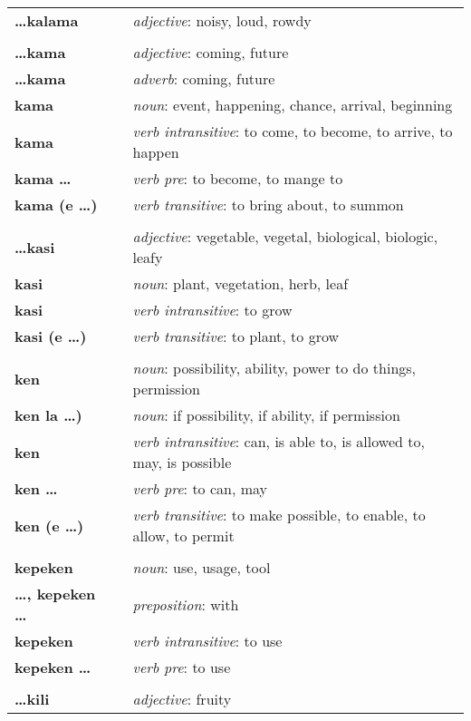 \begin{supertabular}{p{2,5cm}|ll}
\textbf{\dots kalama} && \textit{adjective}: noisy, loud, rowdy \\ 
 && \\ %
\textbf{\dots kama} && \textit{adjective}: coming, future \\ 
\textbf{\dots kama} && \textit{adverb}: coming, future \\ 
\textbf{kama} && \textit{noun}: event, happening, chance, arrival, beginning \\ 
\textbf{kama} && \textit{verb intransitive}: to come, to become, to arrive, to happen \\ 
\textbf{kama \dots} && \textit{verb pre}: to become, to mange to \\ 
\textbf{kama (e \dots)} && \textit{verb transitive}: to bring about, to summon \\ 
 && \\ %
\textbf{\dots kasi} && \textit{adjective}: vegetable, vegetal, biological, biologic, leafy \\ 
\textbf{kasi} && \textit{noun}: plant, vegetation, herb, leaf \\ 
\textbf{kasi} && \textit{verb intransitive}: to grow \\ 
\textbf{kasi (e \dots)} && \textit{verb transitive}: to plant, to grow \\ 
 && \\ %
\textbf{ken} && \textit{noun}: possibility, ability, power to do things, permission \\ 
\textbf{ken la \dots)} && \textit{noun}: if possibility, if ability, if permission \\ 
\textbf{ken} && \textit{verb intransitive}: can, is able to, is allowed to, may, is possible \\ 
\textbf{ken \dots} && \textit{verb pre}: to can, may \\ 
\textbf{ken (e \dots)} && \textit{verb transitive}: to make possible, to enable, to allow, to permit \\ 
 && \\ %
\textbf{kepeken} && \textit{noun}: use, usage, tool \\ 
\textbf{\dots , kepeken \dots} && \textit{preposition}: with \\ 
\textbf{kepeken} && \textit{verb intransitive}: to use \\ 
\textbf{kepeken \dots} && \textit{verb pre}: to use \\ 
 && \\ %
\textbf{\dots kili} && \textit{adjective}: fruity \\ 

\end{supertabular}

